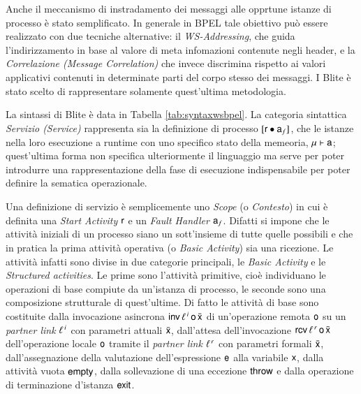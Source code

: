 Anche il meccanismo di instradamento dei messaggi alle opprtune istanze di
processo è stato semplificato. In generale in BPEL tale obiettivo può essere
realizzato con due tecniche alternative: il \emph{WS-Addressing}, che guida
l'indirizzamento in base al valore di meta infomazioni
contenute negli header, e la \emph{Correlazione (Message
Correlation)} che invece discrimina rispetto ai valori applicativi contenuti in
determinate parti del corpo stesso dei messaggi. I Blite è stato scelto di
rappresentare solamente quest'ultima metodologia.

La sintassi di Blite è data in Tabella \ref{tab:syntaxwsbpel}. La categoria
sintattica \emph{Servizio (Service)} rappresenta  sia la definizione di
processo $[{\sf r} \bullet {\sf a}_f]$, che le istanze nella loro esecuzione a runtime
con uno specifico stato della memeoria, ${\sf \mu} \vdash {\sf a}$; quest'ultima
forma non specifica ulteriormente il linguaggio ma serve per poter introdurre
una rappresentazione della fase di esecuzione indispensabile per
poter definire la sematica operazionale.

Una definizione di servizio è semplicemente uno \emph{Scope} (o
\emph{Contesto}) in cui è definita una
\emph{Start Activity} ${\sf r}$ e un \emph{Fault Handler} ${\sf a}_f$. Difatti si
impone che le attività iniziali di un processo siano un sott'insieme di tutte
quelle possibili e che in pratica la prima attività operativa (o \emph{Basic
Activity}) sia una ricezione. Le attività infatti sono divise in due categorie
principali, le \emph{Basic Activity} e le \emph{Structured activities}. Le
prime sono l'attività primitive, cioè individuano le operazioni di
base compiute da un'istanza di processo, le seconde sono una composizione
strutturale di quest'ultime. Di fatto le attività di base sono costituite
dalla invocazione asincrona ${\sf inv}\,\ell^{\,i}\,{\sf o}\,\bar{{\sf x}}$ di un'operazione
remota ${\sf o}$ su un \emph{partner link} $\ell^{\,i}$ con parametri attuali
$\bar{{\sf x}}$, dall'attesa dell'invocazione ${\sf rcv}\,\ell^{\,r}\, {\sf o}\, \bar{{\sf x}}$
dell'operazione locale ${\sf o}$ tramite il \emph{partner link} $\ell^{\,r}$ con
parametri formali ${\bar{{\sf x}}}$, dall'assegnazione della valutazione
dell'espressione ${\sf e}$ alla variabile ${\sf x}$, dalla attività vuota ${\sf empty}$,
dalla sollevazione di una eccezione ${\sf throw}$ e dalla operazione di terminazione
d'istanza ${\sf exit}$.

